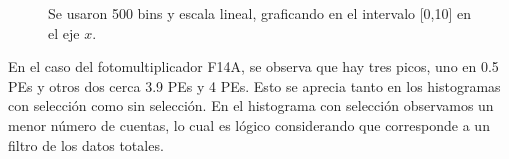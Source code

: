 \documentclass[11pt]{article}
\begin{document}
\begin{figure}[H]
\centering
{}

\caption{Se usaron 500 bins y escala lineal, graficando en el intervalo [0,10] en el eje $x$.}
\label{fig:NormScale}
\end{figure}

En el caso del fotomultiplicador F14A, se observa que hay tres picos, uno en 0.5 PEs y otros dos cerca 3.9 PEs y 4 PEs. Esto se aprecia tanto en los histogramas con selección como sin selección. En el histograma con selección observamos un menor número de cuentas, lo cual es lógico considerando que corresponde a un filtro de los datos totales. 
\end{document}

